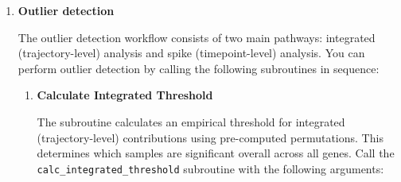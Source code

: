 \documentclass[11pt]{article}
\begin{document}
\begin{enumerate}
\begin{enumerate}
\begin{itemize}
	      	      	\item \texttt{n\_timepoints integer(int32)}: Number of timepoints
	      	      	      
	      	      	\item \texttt{trajectories real(real64)}: 3D trajectories array
	      	      	      
	      	      	\item \texttt{i\_factor integer(int32)}: Factor index
	      	      	      
	      	      	\item \texttt{i\_sample integer(int32)}: Sample index
	      	      	      
	      	      	\item \texttt{result\_vector real(real64)}: Output vector [n\_timepoints]
	      	      	      
	      	      	\item \texttt{ierr integer(int32)}: Error code
	      	      \end{itemize}
	      	      \begin{lstlisting}[language=Fortran, caption={Extract Timepoints Vector}]
call get_vec_across_timepoints(trajectories, n_factors, n_samples, &
                            n_timepoints, i_factor, i_sample, &
                            result_vector, ierr)
	      	      \end{lstlisting}
	      	      
	      	\item \textbf{Outlier detection}
	      	      
	      	      The outlier detection workflow consists of two main pathways:
	      	      integrated (trajectory-level) analysis and spike (timepoint-level)
	      	      analysis. You can perform outlier detection by calling the following subroutines
	      	      in sequence:
	      	      
	      	      \begin{enumerate}
	      	      	\item \textbf{Calculate Integrated Threshold}
	      	      	      
	      	      	      The subroutine calculates an empirical threshold for integrated (trajectory-level)
	      	      	      contributions using pre-computed permutations. This determines
	      	      	      which samples are significant overall across all genes. Call the \texttt{calc\_integrated\_threshold}
	      	      	      subroutine with the following arguments:
	      	      	      

\end{enumerate}
\end{enumerate}
\end{enumerate}
\end{document}
